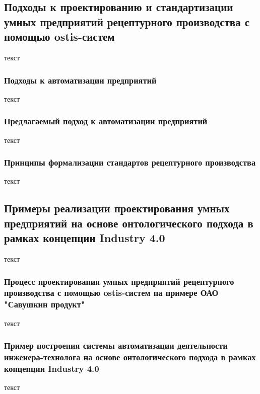 \subsection{Подходы к проектированию и стандартизации умных предприятий рецептурного производства с помощью ostis-систем}

текст

\subsubsection{Подходы к автоматизации предприятий}

текст

\subsubsection{Предлагаемый подход к автоматизации предприятий}

текст

\subsubsection{Принципы формализации стандартов рецептурного производства}

текст

\subsection{Примеры реализации проектирования умных предприятий на основе онтологического подхода в рамках концепции Industry 4.0}

текст

\subsubsection{Процесс проектирования умных предприятий рецептурного производства с помощью ostis-систем на примере ОАО "Савушкин продукт"}

текст

\subsubsection{Пример построения системы автоматизации деятельности инженера-технолога на основе онтологического подхода в рамках концепции Industry 4.0}

текст


%
